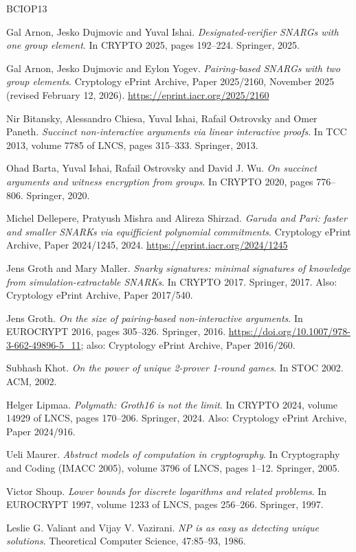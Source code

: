 \documentclass{conjura-conjecture}
\begin{document}
\begin{conjurabibliography}{BCIOP13}

Gal Arnon, Jesko Dujmovic and Yuval Ishai.
\emph{Designated-verifier SNARGs with one group element}.
In CRYPTO 2025, pages 192--224. Springer, 2025.

Gal Arnon, Jesko Dujmovic and Eylon Yogev.
\emph{Pairing-based SNARGs with two group elements}.
Cryptology ePrint Archive, Paper 2025/2160, November 2025 (revised
February 12, 2026).
\url{https://eprint.iacr.org/2025/2160}

Nir Bitansky, Alessandro Chiesa, Yuval Ishai, Rafail Ostrovsky and
Omer Paneth.
\emph{Succinct non-interactive arguments via linear interactive
proofs}.
In TCC 2013, volume 7785 of LNCS, pages 315--333. Springer, 2013.

Ohad Barta, Yuval Ishai, Rafail Ostrovsky and David J. Wu.
\emph{On succinct arguments and witness encryption from groups}.
In CRYPTO 2020, pages 776--806. Springer, 2020.

Michel Dellepere, Pratyush Mishra and Alireza Shirzad.
\emph{Garuda and Pari: faster and smaller SNARKs via equifficient
polynomial commitments}.
Cryptology ePrint Archive, Paper 2024/1245, 2024.
\url{https://eprint.iacr.org/2024/1245}

Jens Groth and Mary Maller.
\emph{Snarky signatures: minimal signatures of knowledge from
simulation-extractable SNARKs}.
In CRYPTO 2017. Springer, 2017.
Also: Cryptology ePrint Archive, Paper 2017/540.

Jens Groth.
\emph{On the size of pairing-based non-interactive arguments}.
In EUROCRYPT 2016, pages 305--326. Springer, 2016.
\url{https://doi.org/10.1007/978-3-662-49896-5_11};
also: Cryptology ePrint Archive, Paper 2016/260.

Subhash Khot.
\emph{On the power of unique 2-prover 1-round games}.
In STOC 2002. ACM, 2002.

Helger Lipmaa.
\emph{Polymath: Groth16 is not the limit}.
In CRYPTO 2024, volume 14929 of LNCS, pages 170--206. Springer,
2024.
Also: Cryptology ePrint Archive, Paper 2024/916.

Ueli Maurer.
\emph{Abstract models of computation in cryptography}.
In Cryptography and Coding (IMACC 2005), volume 3796 of LNCS,
pages 1--12. Springer, 2005.

Victor Shoup.
\emph{Lower bounds for discrete logarithms and related problems}.
In EUROCRYPT 1997, volume 1233 of LNCS, pages 256--266.
Springer, 1997.

Leslie G. Valiant and Vijay V. Vazirani.
\emph{NP is as easy as detecting unique solutions}.
Theoretical Computer Science, 47:85--93, 1986.

\end{conjurabibliography}
\end{document}
